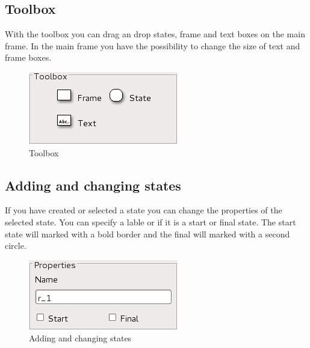 \documentclass[%
  a4paper,%
  11pt,%
  blue,%
  hyperref	%
  ]{tubsartcl}
\begin{document}
\newpage

\subsection{Toolbox}
\label{sec:toolbox}
With the toolbox you can drag an drop states, frame and text boxes on the main frame. In the main frame you have the possibility to change the size of text and frame boxes. 
\begin{figure}[!htb]
\begin{center}
\includegraphics[scale=0.5]{graphics_gui/toolbox_turing.png}
\end{center}
\caption{Toolbox}
\label{pic:toolbox}
\end{figure}

\newpage

\subsection{Adding and changing states}
\label{sec:add-edit-states}
If you have created or selected a state you can change the properties of the selected state. You can specify a lable or if it is a start or final state. The start state will marked with a bold border and the final will marked with a second circle.
\begin{figure}[!htb]
\begin{center}
\includegraphics[scale=0.5]{graphics_gui/state_properties.png}
\end{center}
\caption{Adding and changing states}
\label{pic:state_properties}
\end{figure}

\newpage
\end{document}

